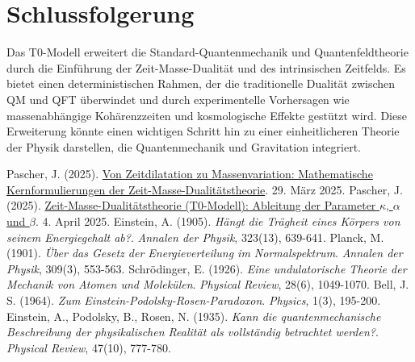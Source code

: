 \documentclass{article}
\begin{document}
	\section{Schlussfolgerung}
	Das T0-Modell erweitert die Standard-Quantenmechanik und Quantenfeldtheorie durch die Einführung der Zeit-Masse-Dualität und des intrinsischen Zeitfelds. Es bietet einen deterministischen Rahmen, der die traditionelle Dualität zwischen QM und QFT überwindet und durch experimentelle Vorhersagen wie massenabhängige Kohärenzzeiten und kosmologische Effekte gestützt wird. Diese Erweiterung könnte einen wichtigen Schritt hin zu einer einheitlicheren Theorie der Physik darstellen, die Quantenmechanik und Gravitation integriert.
	
	\begin{thebibliography}{99}
		 Pascher, J. (2025). \href{https://github.com/jpascher/T0-Time-Mass-Duality/tree/main/2/pdf/Deutsch/Mathematische Formulierungen der Zeit-Masse-Dualitätstheorie mit Lagrange.pdf}{Von Zeitdilatation zu Massenvariation: Mathematische Kernformulierungen der Zeit-Masse-Dualitätstheorie}. 29. März 2025.
		 Pascher, J. (2025). \href{https://github.com/jpascher/T0-Time-Mass-Duality/tree/main/2/pdf/Deutsch/Zeit-Masse-Dualitätstheorie (T0-Modell) Herleitung der Parameter kappa, alpha und beta.pdf}{Zeit-Masse-Dualitätstheorie (T0-Modell): Ableitung der Parameter \(\kappa\), \(\alpha\) und \(\beta\)}. 4. April 2025.
		 Einstein, A. (1905). \textit{Hängt die Trägheit eines Körpers von seinem Energiegehalt ab?}. \textit{Annalen der Physik}, 323(13), 639-641.
		 Planck, M. (1901). \textit{Über das Gesetz der Energieverteilung im Normalspektrum}. \textit{Annalen der Physik}, 309(3), 553-563.
		 Schrödinger, E. (1926). \textit{Eine undulatorische Theorie der Mechanik von Atomen und Molekülen}. \textit{Physical Review}, 28(6), 1049-1070.
		 Bell, J. S. (1964). \textit{Zum Einstein-Podolsky-Rosen-Paradoxon}. \textit{Physics}, 1(3), 195-200.
		 Einstein, A., Podolsky, B., Rosen, N. (1935). \textit{Kann die quantenmechanische Beschreibung der physikalischen Realität als vollständig betrachtet werden?}. \textit{Physical Review}, 47(10), 777-780.
	\end{thebibliography}
	
\end{document}
